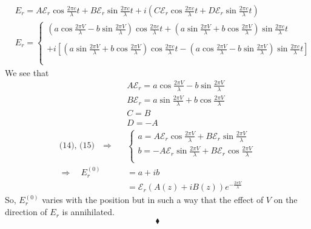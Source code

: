 \begin{align}
&E^{}_r=A\mathcal{E}_r\cos \frac{2\pi c}{\lambda} t + B\mathcal{E}_r\sin \frac{2\pi c}{\lambda} t+i\left(C\mathcal{E}_r\cos \frac{2\pi c}{\lambda}  t + D\mathcal{E}_r\sin \frac{2\pi c}{\lambda}  t \right)\\
&E^{}_r=\left\{\begin{array}{l}\left(a\cos \frac{2\pi V}{\lambda}-b\sin \frac{2\pi V}{\lambda}\right)\cos \frac{2\pi c}{\lambda}t+\left(a\sin \frac{2\pi V}{\lambda}+b\cos \frac{2\pi V}{\lambda}\right)\sin \frac{2\pi c}{\lambda}t\\\\
+i\left[
\left(a\sin \frac{2\pi V}{\lambda}+b\cos \frac{2\pi V}{\lambda}\right)\cos \frac{2\pi c}{\lambda}t-\left(a\cos \frac{2\pi V}{\lambda}-b\sin \frac{2\pi V}{\lambda}\right)\sin \frac{2\pi c}{\lambda}t
\right]\\\\
\end{array}\right.
\end{align}
We see that 
\begin{align}
&A\mathcal{E}_r= a\cos \frac{2\pi V}{\lambda}-b\sin \frac{2\pi V}{\lambda}\\
&B\mathcal{E}_r= a\sin \frac{2\pi V}{\lambda}+b\cos \frac{2\pi V}{\lambda}\\
&C=B\\
&D=-A\\
\text{(14), (15)}\quad\Rightarrow \quad &\left\{\begin{array}{l}a= A\mathcal{E}_r\cos \frac{2\pi V}{\lambda}+B\mathcal{E}_r\sin \frac{2\pi V}{\lambda}\\
b= -A\mathcal{E}_r\sin \frac{2\pi V}{\lambda}+B\mathcal{E}_r\cos \frac{2\pi V}{\lambda}\\
\end{array}\right.\\
\Rightarrow \quad E^{(0)}_r&= a+ib\\
&=\mathcal{E}_r\left(A\left(z\right)+iB\left(z\right)\right)e^{-\frac{2\pi V}{\lambda}}
\end{align}
So, $E^{(0)}_r$ varies with the position but in such a way that the effect of $V$ on the direction of $E_r$ is annihilated.
$$\blacklozenge$$
\newpage